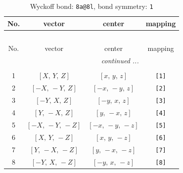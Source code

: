 \documentclass[fleqn,8pt]{jsarticle}
\begin{document}
\begin{longtable}{cccc}
\caption{Wyckoff bond: {\tt 8a@8l}, bond symmetry: {\tt 1}}
 \\
 \hline \hline
No. & vector & center & mapping \\ \hline \endfirsthead

\multicolumn{3}{l}{\tablename\ \thetable{}} \\
 \hline \hline
No. & vector & center & mapping \\ \hline \endhead

 \hline \hline
\multicolumn{3}{r}{\footnotesize\it continued ...} \\ \endfoot

 \hline \hline
\multicolumn{3}{r}{} \\ \endlastfoot

1 & $\left[ X,\, Y,\, Z \right]$ & $\left[ x,\, y,\, z \right]$ & {\tt [1]} \\ \hline
2 & $\left[ - X,\, - Y,\, Z \right]$ & $\left[ - x,\, - y,\, z \right]$ & {\tt [2]} \\ \hline
3 & $\left[ - Y,\, X,\, Z \right]$ & $\left[ - y,\, x,\, z \right]$ & {\tt [3]} \\ \hline
4 & $\left[ Y,\, - X,\, Z \right]$ & $\left[ y,\, - x,\, z \right]$ & {\tt [4]} \\ \hline
5 & $\left[ - X,\, - Y,\, - Z \right]$ & $\left[ - x,\, - y,\, - z \right]$ & {\tt [5]} \\ \hline
6 & $\left[ X,\, Y,\, - Z \right]$ & $\left[ x,\, y,\, - z \right]$ & {\tt [6]} \\ \hline
7 & $\left[ Y,\, - X,\, - Z \right]$ & $\left[ y,\, - x,\, - z \right]$ & {\tt [7]} \\ \hline
8 & $\left[ - Y,\, X,\, - Z \right]$ & $\left[ - y,\, x,\, - z \right]$ & {\tt [8]} \\
\end{longtable}
\end{document}
